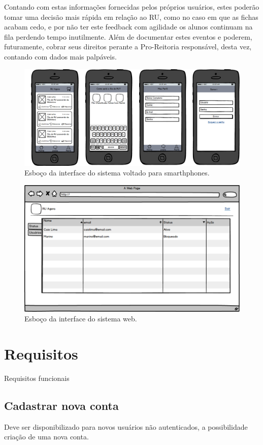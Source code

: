 \documentclass[12pt]{article}
\begin{document}
Contando com estas informações fornecidas pelos próprios usuários, estes poderão tomar uma decisão
mais rápida em relação ao RU, como no caso em que as fichas acabam cedo, e por não ter este feedback
com agilidade os alunos continuam na fila perdendo tempo inutilmente. Além de documentar estes eventos
e poderem, futuramente, cobrar seus direitos perante a Pro-Reitoria responsável, desta vez, contando
com dados mais palpáveis.

\begin{figure}[ht]
\centering
\includegraphics[width=.7\textwidth]{assets/img/home.png}
\caption{Esboço da interface do sistema voltado para smarthphones.}
\label{fig:mobilefig}
\end{figure}

\begin{figure}[ht]
\centering
\includegraphics[width=.7\textwidth]{assets/img/mockup.png}
\caption{Esboço da interface do sistema web.}
\label{fig:webfig}
\end{figure}

\newpage
\section{Requisitos}

Requisitos funcionais

\subsection{Cadastrar nova conta}
Deve ser disponibilizado para novos usuários não autenticados, a possibilidade criação de uma nova conta.
\end{document}
